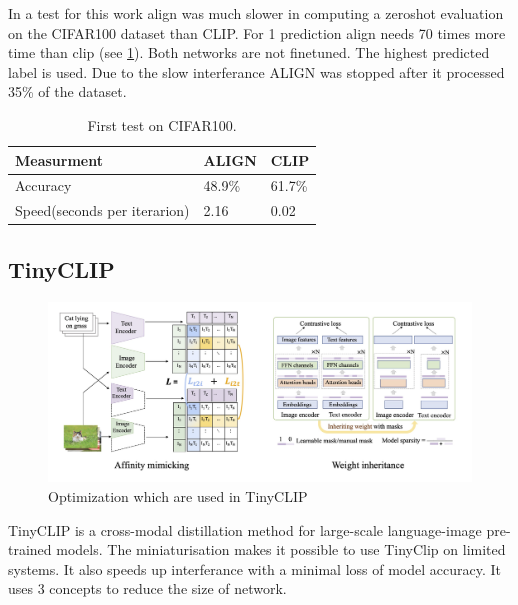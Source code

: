         In a test for this work \acrshort{align} was much slower in computing a zeroshot evaluation on the CIFAR100\cite{cifar100} dataset than CLIP.
        For 1 prediction \acrshort{align} needs 70 times more time than \acrshort{clip} (see \cref{tab:clipaligntest}).
        Both networks are not finetuned. The highest predicted label is used. Due to the slow interferance ALIGN was stopped after it processed 35\% of the dataset.

        \begin{table}
            \centering
            \begin{tabular}{lll}
                \hline
            \textbf{Measurment}&\textbf{ALIGN}&\textbf{CLIP}\\\hline
            Accuracy& 48.9\% & 61.7\%\\
            Speed(seconds per iterarion)&  2.16&  0.02\\ \hline
            \end{tabular}
            \caption{First test on CIFAR100.}
            \label{tab:clipaligntest}
        \end{table}

        \subsection{TinyCLIP
            \label{section:tinyclip}}
        \begin{figure}
            \centering
            \includegraphics[width=\textwidth]{Images/crossmodalnetworks/TinyCLIP.jpg}
            \caption{Optimization which are used in TinyCLIP\cite{tinyclip}}
            \label{fig:crossmodalnetworks:tinyclip}
        \end{figure}

        TinyCLIP\cite{tinyclip} is a cross-modal distillation method for large-scale language-image pre-trained models.
        The miniaturisation makes it possible to use TinyClip on limited systems.
        It also speeds up interferance with a minimal loss of model accuracy.
        It uses 3 concepts to reduce the size of network.

